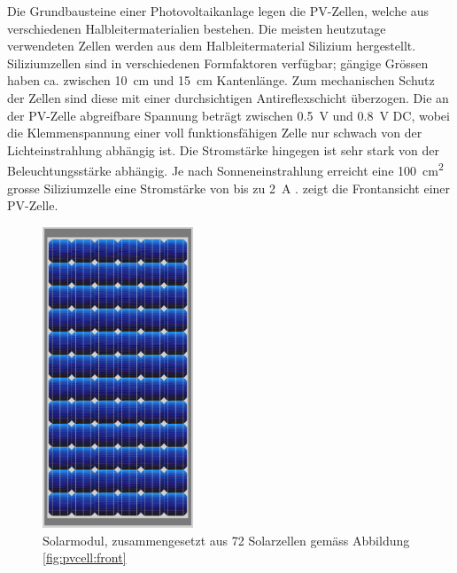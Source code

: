 Die   Grundbausteine    einer   Photovoltaikanlage   legen    die   PV-Zellen,
welche   aus   verschiedenen   Halbleitermaterialien   bestehen. Die   meisten
heutzutage  verwendeten  Zellen  werden aus  dem  Halbleitermaterial  Silizium
hergestellt. Siliziumzellen  sind in  verschiedenen Formfaktoren  verf\"ugbar;
g\"angige   Gr\"ossen    haben   ca.   zwischen    \SI{10}{\centi\meter}   und
\SI{15}{\centi\meter}  Kantenl\"ange.   Zum  mechanischen  Schutz  der  Zellen
sind  diese mit  einer durchsichtigen  Antireflexschicht \"uberzogen.   Die an
der  PV-Zelle  abgreifbare  Spannung betr\"agt  zwischen  \SI{0.5}{\volt}  und
\SI{0.8}{\volt} DC,  wobei die  Klemmenspannung einer  voll funktionsf\"ahigen
Zelle nur schwach von  der Lichteinstrahlung abh\"angig ist. Die Stromst\"arke
hingegen   ist  sehr   stark  von   der  Beleuchtungsst\"arke   abh\"angig. Je
nach    Sonneneinstrahlung   erreicht    eine   \SI{100}{\centi\meter\squared}
grosse   Siliziumzelle  eine   Stromst\"arke   von   bis  zu   \SI{2}{\ampere}
\cite{ref:pv:gesellschaftFuerSonnenenergie}.  zeigt die
Frontansicht einer PV-Zelle.

\clearpage
\begin{figure}
    \centering
    \includegraphics[width=0.4\textwidth]{images/solar-facility/pvmodule.jpeg}
    \caption{
        Solarmodul,  zusammengesetzt  aus  72 Solarzellen  gem\"ass  Abbildung
        \ref{fig:pvcell:front}%
    }
    \label{fig:pvmodule}
\end{figure}


